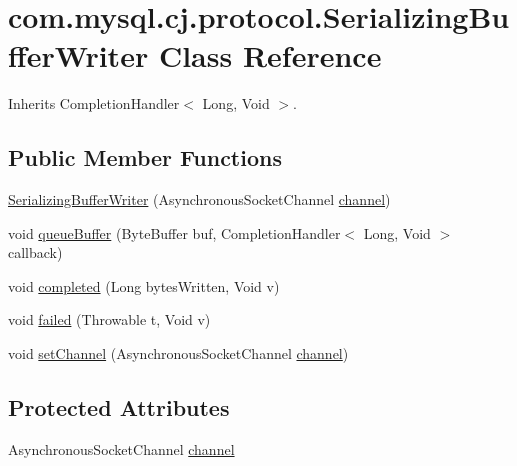 \hypertarget{classcom_1_1mysql_1_1cj_1_1protocol_1_1_serializing_buffer_writer}{}\section{com.\+mysql.\+cj.\+protocol.\+Serializing\+Buffer\+Writer Class Reference}
\label{classcom_1_1mysql_1_1cj_1_1protocol_1_1_serializing_buffer_writer}


Inherits Completion\+Handler$<$ Long, Void $>$.

\subsection*{Public Member Functions}
\begin{DoxyCompactItemize}
\item 
\mbox{\hyperlink{classcom_1_1mysql_1_1cj_1_1protocol_1_1_serializing_buffer_writer_a9e0d4a42d01bb141b8a2ab1b2505c7ab}{Serializing\+Buffer\+Writer}} (Asynchronous\+Socket\+Channel \mbox{\hyperlink{classcom_1_1mysql_1_1cj_1_1protocol_1_1_serializing_buffer_writer_a2c945e406ea10c40aa113a7c111570c6}{channel}})
\item 
void \mbox{\hyperlink{classcom_1_1mysql_1_1cj_1_1protocol_1_1_serializing_buffer_writer_af340d231ae86b9546e151aae7515f4e3}{queue\+Buffer}} (Byte\+Buffer buf, Completion\+Handler$<$ Long, Void $>$ callback)
\item 
void \mbox{\hyperlink{classcom_1_1mysql_1_1cj_1_1protocol_1_1_serializing_buffer_writer_a5cedb5f89370707b473b5e8619c7ccf1}{completed}} (Long bytes\+Written, Void v)
\item 
void \mbox{\hyperlink{classcom_1_1mysql_1_1cj_1_1protocol_1_1_serializing_buffer_writer_ad46b2551c4658e8281f80788a7b7ab32}{failed}} (Throwable t, Void v)
\item 
void \mbox{\hyperlink{classcom_1_1mysql_1_1cj_1_1protocol_1_1_serializing_buffer_writer_ac59dda63c81fa3c5f00f82924b1c63c5}{set\+Channel}} (Asynchronous\+Socket\+Channel \mbox{\hyperlink{classcom_1_1mysql_1_1cj_1_1protocol_1_1_serializing_buffer_writer_a2c945e406ea10c40aa113a7c111570c6}{channel}})
\end{DoxyCompactItemize}
\subsection*{Protected Attributes}
\begin{DoxyCompactItemize}
\item 
Asynchronous\+Socket\+Channel \mbox{\hyperlink{classcom_1_1mysql_1_1cj_1_1protocol_1_1_serializing_buffer_writer_a2c945e406ea10c40aa113a7c111570c6}{channel}}
\end{DoxyCompactItemize}


